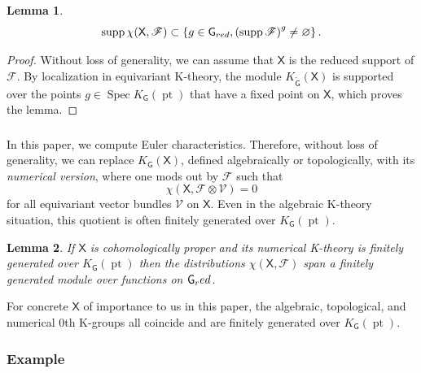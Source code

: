 \documentclass[14pt]{extarticle}
\newcommand{\bG}{\mathsf{G}}
\newcommand{\bGt}{{\widetilde{\mathsf{G}}}}
\newcommand{\bX}{\mathsf{X}}
\newcommand{\cF}{\mathscr{F}}
\newcommand{\cV}{\mathscr{V}}
\newcommand{\red}{\textup{red}}
\DeclareMathOperator{\pt}{pt}
\DeclareMathOperator{\Spec}{Spec}
\DeclareMathOperator{\supp}{supp}
\newtheorem{Lemma}{Lemma}[section]
\theoremstyle{definition}
\begin{document}
\begin{Lemma}
  \begin{equation}
    \label{eq:41}
    \supp \chi(\bX,\cF) \subset \{g \in \bG_{\textup{red}}, \left(\supp
      \cF\right)^g \ne \varnothing \} \,. 
  \end{equation}
\end{Lemma}

\begin{proof}
Without loss of generality, we can assume that $\bX$ is the reduced
support of $\cF$. By localization in equivariant K-theory, the module $K_\bGt(\bX)$
is supported over the points $g\in \Spec K_\bG(\pt)$ that have a fixed
point on $\bX$, which proves the lemma. 
\end{proof}

\subsubsection{}\label{s_finite}
In this paper, we compute Euler characteristics. Therefore, without
loss of generality, we can replace $K_\bG(\bX)$, defined algebraically
or topologically, with its \emph{numerical version}, where one mods
out by $\cF$ such that
\[
  \chi(\bX, \cF \otimes \cV) = 0
\]
for all equivariant vector bundles $\cV$ on $\bX$. Even in the algebraic
K-theory situation, this quotient is often finitely generated over 
$K_\bG(\pt)$. 

\begin{Lemma}
If $\bX$ is cohomologically proper
and its numerical K-theory is finitely generated over $K_\bG(\pt)$ then the distributions
$\chi(\bX,\cF)$ span a finitely generated module over functions on
$\bG_\red$. 
\end{Lemma}

\noindent 
For concrete $\bX$ of importance to us in this paper, the
algebraic, topological, and numerical 0th K-groups all coincide and
are finitely generated over $K_\bG(\pt)$.



\subsubsection{Example}\label{s_eGH} 
\end{document}
